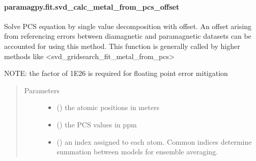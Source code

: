 \documentclass[a4paper,10pt,english]{sphinxmanual}
\begin{document}
\paragraph{paramagpy.fit.svd\_calc\_metal\_from\_pcs\_offset}
\label{\detokenize{reference/generated/paramagpy.fit.svd_calc_metal_from_pcs_offset:paramagpy-fit-svd-calc-metal-from-pcs-offset}}\label{\detokenize{reference/generated/paramagpy.fit.svd_calc_metal_from_pcs_offset::doc}}

\begin{fulllineitems}
\label{\detokenize{reference/generated/paramagpy.fit.svd_calc_metal_from_pcs_offset:paramagpy.fit.svd_calc_metal_from_pcs_offset}}
Solve PCS equation by single value decomposition with offset.
An offset arising from referencing errors between diamagnetic
and paramagnetic datasets can be accounted for using this method.
This function is generally called by higher methods like
\textless{}svd\_gridsearch\_fit\_metal\_from\_pcs\textgreater{}

NOTE: the factor of 1E26 is required for floating point error mitigation
\begin{quote}\begin{description}
\item[{Parameters}] \leavevmode\begin{itemize}
\item {} 
 (\sphinxstyleliteralemphasis{\sphinxupquote{ {[}}}\sphinxstyleliteralemphasis{\sphinxupquote{,}}\sphinxstyleliteralemphasis{\sphinxupquote{,}}\sphinxstyleliteralemphasis{\sphinxupquote{{]} }}) \textendash{} the atomic positions in meters

\item {} 
 () \textendash{} the PCS values in ppm

\item {} 
 () \textendash{} an index assigned to each atom. Common indices determine summation
between models for ensemble averaging.


\end{itemize}
\end{description}
\end{quote}
\end{fulllineitems}
\end{document}
